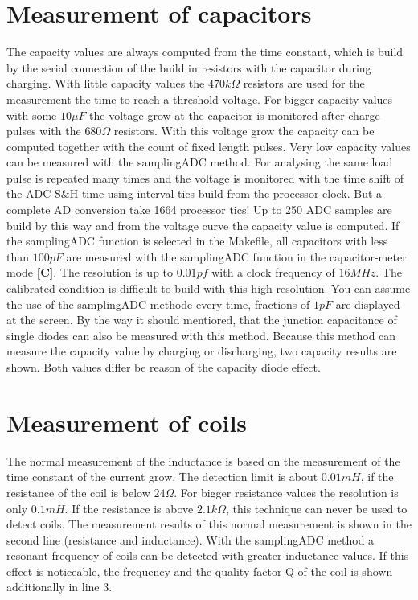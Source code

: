 \section{Measurement of capacitors}
The capacity values are always computed from the time constant, which is build by the serial connection of the
build in resistors with the capacitor during charging. With little capacity values the \(470k\Omega\) resistors are
used for the measurement the time to reach a threshold voltage.
For bigger capacity values with some \(10\mu F\) the voltage grow at the capacitor is monitored after charge pulses with the
\(680\Omega\) resistors. With this voltage grow the capacity can be computed together with the count of fixed length pulses.
Very low capacity values can be measured with the samplingADC method.
For analysing the same load pulse is repeated many times and the voltage is monitored with the time shift of the ADC S\&H time
using interval-tics build from the processor clock. But a complete AD conversion take 1664 processor tics!
Up to 250 ADC samples are build by this way and from the voltage curve the capacity value is computed.
If the samplingADC function is selected in the Makefile, all capacitors with less than \(100pF\) are measured with
the samplingADC function in the capacitor-meter mode {\bf[C]}. The resolution is up to \(0.01pf\) with a clock 
frequency of \(16MHz\). The calibrated condition is difficult to build with this high resolution.
You can assume the use of the samplingADC methode every time, fractions of \(1pF\) are displayed at the screen.
By the way it should mentiored, that the junction capacitance of single diodes can also be measured with
this method. Because this method can measure the capacity value by charging or discharging, two capacity results are shown.
Both values differ be reason of the capacity diode effect.

\section{Measurement of coils}
The normal measurement of the inductance is based on the measurement of the time constant of the current grow.
The detection limit is about \(0.01mH\), if the resistance of the coil is below \(24\Omega\).
For bigger resistance values the resolution is only \(0.1mH\).
If the resistance is above \(2.1k\Omega\), this technique can never be used to detect coils.
The measurement results of this normal measurement is shown in the second line (resistance and inductance).
With the samplingADC method a resonant frequency of coils can be detected with greater inductance values.
If this effect is noticeable, the frequency and the quality factor Q of the coil is shown additionally in line 3. 


